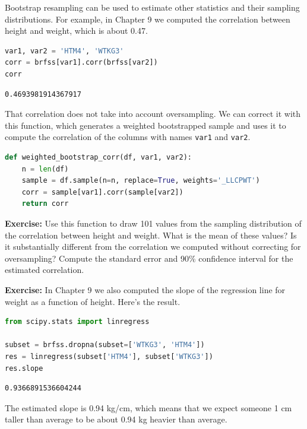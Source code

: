 Bootstrap resampling can be used to estimate other statistics and their
sampling distributions. For example, in Chapter 9 we computed the
correlation between height and weight, which is about 0.47.

\begin{lstlisting}[language=Python,style=source]
var1, var2 = 'HTM4', 'WTKG3'
corr = brfss[var1].corr(brfss[var2])
corr
\end{lstlisting}

\begin{lstlisting}[style=output]
0.4693981914367917
\end{lstlisting}

That correlation does not take into account oversampling. We can correct
it with this function, which generates a weighted bootstrapped sample
and uses it to compute the correlation of the columns with names
\passthrough{\lstinline!var1!} and \passthrough{\lstinline!var2!}.

\begin{lstlisting}[language=Python,style=source]
def weighted_bootstrap_corr(df, var1, var2):
    n = len(df)
    sample = df.sample(n=n, replace=True, weights='_LLCPWT')
    corr = sample[var1].corr(sample[var2])
    return corr
\end{lstlisting}

\textbf{Exercise:} Use this function to draw 101 values from the
sampling distribution of the correlation between height and weight. What
is the mean of these values? Is it substantially different from the
correlation we computed without correcting for oversampling? Compute the
standard error and 90\% confidence interval for the estimated
correlation.

\textbf{Exercise:} In Chapter 9 we also computed the slope of the
regression line for weight as a function of height. Here's the result.

\begin{lstlisting}[language=Python,style=source]
from scipy.stats import linregress

subset = brfss.dropna(subset=['WTKG3', 'HTM4'])
res = linregress(subset['HTM4'], subset['WTKG3'])
res.slope
\end{lstlisting}

\begin{lstlisting}[style=output]
0.9366891536604244
\end{lstlisting}

The estimated slope is 0.94 kg/cm, which means that we expect someone 1
cm taller than average to be about 0.94 kg heavier than average.

